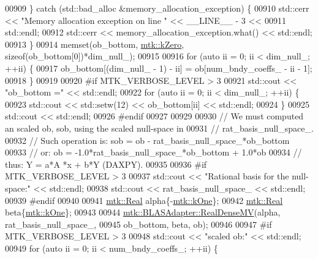 \begin{DoxyCode}
{{00909     \} \textcolor{keywordflow}{catch} (std::bad\_alloc &memory\_allocation\_exception) \{
00910       std::cerr << \textcolor{stringliteral}{"Memory allocation exception on line "} << \_\_LINE\_\_ - 3 <<
00911         std::endl;
00912       std::cerr << memory\_allocation\_exception.what() << std::endl;
00913     \}
00914     memset(ob\_bottom, \hyperlink{group__c01-roots_ga59a451a5fae30d59649bcda274fea271}{mtk::kZero}, \textcolor{keyword}{sizeof}(ob\_bottom[0])*dim\_null\_);
00915 
00916     \textcolor{keywordflow}{for} (\textcolor{keyword}{auto} ii = 0; ii < dim\_null\_; ++ii) \{
00917       ob\_bottom[(dim\_null\_ - 1) - ii] = ob[num\_bndy\_coeffs\_ - ii - 1];
00918     \}
00919 
00920 \textcolor{preprocessor}{    #if MTK\_VERBOSE\_LEVEL > 3}
00921     std::cout << \textcolor{stringliteral}{"ob\_bottom ="} << std::endl;
00922     \textcolor{keywordflow}{for} (\textcolor{keyword}{auto} ii = 0; ii < dim\_null\_; ++ii) \{
00923       std::cout << std::setw(12) << ob\_bottom[ii] << std::endl;
00924     \}
00925     std::cout << std::endl;
00926 \textcolor{preprocessor}{    #endif}
00927 
00929 
00930     \textcolor{comment}{// We must computed an scaled ob, sob, using the scaled null-space in}
00931     \textcolor{comment}{// rat\_basis\_null\_space\_.}
00932     \textcolor{comment}{// Such operation is: sob = ob - rat\_basis\_null\_space\_*ob\_bottom}
00933     \textcolor{comment}{// or:                 ob = -1.0*rat\_basis\_null\_space\_*ob\_bottom + 1.0*ob}
00934     \textcolor{comment}{// thus:                Y =    a*A    *x         +   b*Y (DAXPY).}
00935 
00936 \textcolor{preprocessor}{    #if MTK\_VERBOSE\_LEVEL > 3}
00937     std::cout << \textcolor{stringliteral}{"Rational basis for the null-space:"} << std::endl;
00938     std::cout << rat\_basis\_null\_space\_ << std::endl;
00939 \textcolor{preprocessor}{    #endif}
00940 
00941     \hyperlink{group__c01-roots_gac080bbbf5cbb5502c9f00405f894857d}{mtk::Real} alpha\{-\hyperlink{group__c01-roots_ga26407c24d43b6b95480943340d285c71}{mtk::kOne}\};
00942     \hyperlink{group__c01-roots_gac080bbbf5cbb5502c9f00405f894857d}{mtk::Real} beta\{\hyperlink{group__c01-roots_ga26407c24d43b6b95480943340d285c71}{mtk::kOne}\};
00943 
00944     \hyperlink{classmtk_1_1BLASAdapter_afdcac059a4294287cb55638221220646}{mtk::BLASAdapter::RealDenseMV}(alpha, rat\_basis\_null\_space\_,
00945                                   ob\_bottom, beta, ob);
00946 
00947 \textcolor{preprocessor}{    #if MTK\_VERBOSE\_LEVEL > 3}
00948     std::cout << \textcolor{stringliteral}{"scaled ob:"} << std::endl;
00949     \textcolor{keywordflow}{for} (\textcolor{keyword}{auto} ii = 0; ii < num\_bndy\_coeffs\_; ++ii) \{
}}
\end{DoxyCode}
